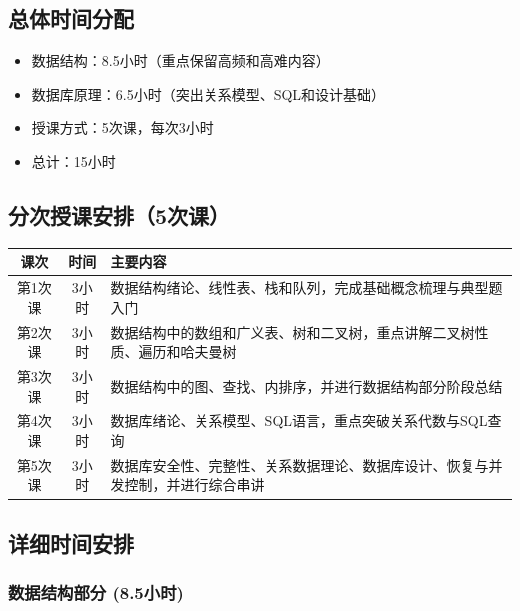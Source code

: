 \documentclass{../note}
\begin{document}
\subsection{总体时间分配}
\begin{itemize}
	\item 数据结构：8.5小时（重点保留高频和高难内容）
	\item 数据库原理：6.5小时（突出关系模型、SQL和设计基础）
	\item 授课方式：5次课，每次3小时
	\item 总计：15小时
\end{itemize}

\subsection{分次授课安排（5次课）}
\begin{tabular}{|c|c|p{10cm}|}
	\hline
	\textbf{课次} & \textbf{时间} & \textbf{主要内容} \\
	\hline
	第1次课 & 3小时 & 数据结构绪论、线性表、栈和队列，完成基础概念梳理与典型题入门 \\
	\hline
	第2次课 & 3小时 & 数据结构中的数组和广义表、树和二叉树，重点讲解二叉树性质、遍历和哈夫曼树 \\
	\hline
	第3次课 & 3小时 & 数据结构中的图、查找、内排序，并进行数据结构部分阶段总结 \\
	\hline
	第4次课 & 3小时 & 数据库绪论、关系模型、SQL语言，重点突破关系代数与SQL查询 \\
	\hline
	第5次课 & 3小时 & 数据库安全性、完整性、关系数据理论、数据库设计、恢复与并发控制，并进行综合串讲 \\
	\hline
\end{tabular}

\subsection{详细时间安排}

\subsubsection{数据结构部分 (8.5小时)}
\end{document}
